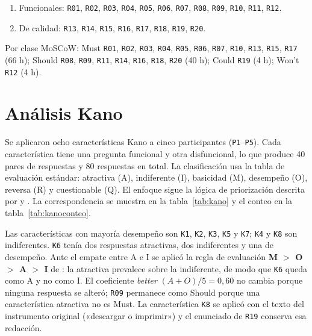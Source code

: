 \documentclass[11pt,a4paper]{article}
\begin{document}
\begin{enumerate}
\item Funcionales: \texttt{R01}, \texttt{R02}, \texttt{R03}, \texttt{R04}, \texttt{R05}, \texttt{R06}, \texttt{R07}, \texttt{R08}, \texttt{R09}, \texttt{R10}, \texttt{R11}, \texttt{R12}.
\item De calidad: \texttt{R13}, \texttt{R14}, \texttt{R15}, \texttt{R16}, \texttt{R17}, \texttt{R18}, \texttt{R19}, \texttt{R20}.
\end{enumerate}

Por clase MoSCoW: Must \texttt{R01}, \texttt{R02}, \texttt{R03}, \texttt{R04}, \texttt{R05}, \texttt{R06}, \texttt{R07}, \texttt{R10}, \texttt{R13}, \texttt{R15}, \texttt{R17} (66 h); Should \texttt{R08}, \texttt{R09}, \texttt{R11}, \texttt{R14}, \texttt{R16}, \texttt{R18}, \texttt{R20} (40 h); Could \texttt{R19} (4 h); Won't \texttt{R12} (4 h).

\section{Análisis Kano}
Se aplicaron ocho características Kano a cinco participantes (\texttt{P1}--\texttt{P5}). Cada característica tiene una pregunta funcional y otra disfuncional, lo que produce 40 pares de respuestas y 80 respuestas en total. La clasificación usa la tabla de evaluación estándar: atractiva (A), indiferente (I), basicidad (M), desempeño (O), reversa (R) y cuestionable (Q). El enfoque sigue la lógica de priorización descrita por \cite{pohl2025} y \cite{ireb2026}. La correspondencia se muestra en la tabla~\ref{tab:kano} y el conteo en la tabla~\ref{tab:kanoconteo}.





Las características con mayoría desempeño son \texttt{K1}, \texttt{K2}, \texttt{K3}, \texttt{K5} y \texttt{K7}; \texttt{K4} y \texttt{K8} son indiferentes. \texttt{K6} tenía dos respuestas atractivas, dos indiferentes y una de desempeño. Ante el empate entre A e I se aplicó la regla de evaluación \textbf{M $>$ O $>$ A $>$ I} de \cite{sauerwein1996}: la atractiva prevalece sobre la indiferente, de modo que \texttt{K6} queda como A y no como I. El coeficiente \emph{better} $(A+O)/5 = 0{,}60$ no cambia porque ninguna respuesta se alteró; \texttt{R09} permanece como Should porque una característica atractiva no es Must. La característica \texttt{K8} se aplicó con el texto del instrumento original («descargar o imprimir») y el enunciado de \texttt{R19} conserva esa redacción.
\end{document}
